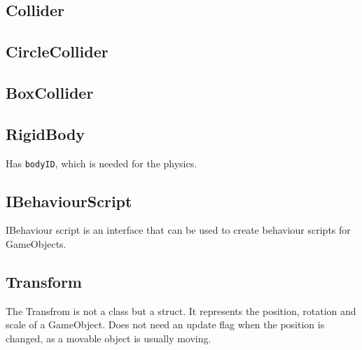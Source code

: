 \subsection{Collider}

\subsection{CircleCollider}

\subsection{BoxCollider}

\subsection{RigidBody}
Has \texttt{bodyID}, which is needed for the physics.

\subsection{IBehaviourScript}
IBehaviour script is an interface that can be used to create behaviour scripts for GameObjects.

\subsection{Transform}
The Transfrom is not a class but a struct. It represents the position, rotation and scale of a GameObject.
Does not need an update flag when the position is changed, as a movable object is usually moving.


